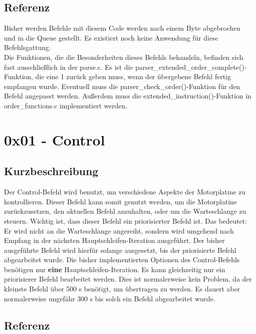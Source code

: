 \documentclass[a4paper]{article}
\begin{document}
	\subsection{Referenz}

	Bisher werden Befehle mit diesem Code werden nach einem Byte abgebrochen
	und in die Queue gestellt. Es existiert noch keine Anwendung für diese
	Befehlsgattung.
	\\
	Die Funktionen, die die Besonderheiten dieses Befehls behandeln, befinden
	sich fast ausschließlich in der parse.c. Es ist die
	parser\_extended\_order\_complete()-Funktion, die eine 1 zurück geben muss,
	wenn der übergebene Befehl fertig empfangen wurde. Eventuell muss die
	parser\_check\_order()-Funktion für den Befehl angepasst werden. Außerdem
	muss die extended\_instruction()-Funktion in order\_functions.c implementiert
	werden.
	
	\pagebreak

	\section{0x01 - Control}

	\subsection{Kurzbeschreibung}
	
	Der Control-Befehl wird benutzt, um verschiedene Aspekte der Motorplatine
	zu kontrollieren. Dieser Befehl kann somit genutzt werden, um die
	Motorplatine zurückzusetzen, den aktuellen Befehl anzuhalten, oder
	um die Warteschlange zu steuern. Wichtig ist, dass dieser Befehl
	ein priorisierter Befehl ist. Das bedeutet: Er wird nicht an die
	Warteschlange angereiht, sondern wird umgehend nach Empfang in der
	nächsten Hauptschleifen-Iteration ausgeführt. Der bisher ausgeführte Befehl
	wird hierfür solange ausgesetzt, bis der priorisierte Befehl abgearbeitet
	wurde. Die bisher implementierten Optionen des Control-Befehls benötigen
	nur \textbf{eine} Hauptschleifen-Iteration. Es kann gleichzeitig nur
	ein priorisierer Befehl bearbeitet werden. Dies ist normalerweise kein
	Problem, da der kleinste Befehl über 500 \textmu{}s benötigt, um übertragen
	zu werden. Es dauert aber normalerweise ungefähr 300 \textmu{}s bis solch
	ein Befehl abgearbeitet wurde.


	\subsection{Referenz}
\end{document}
